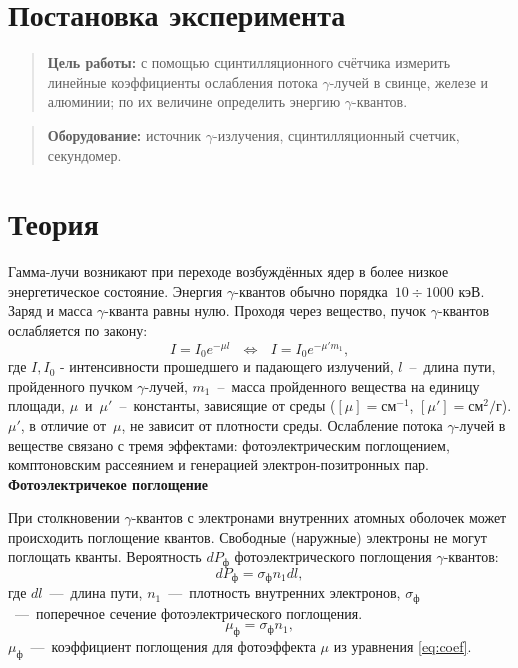 \documentclass{lab}
\begin{document}

\section*{Постановка эксперимента}

\begin{quote}
	\textbf{{\normalsize Цель работы: }}
	с помощью сцинтилляционного счётчика измерить линейные коэффициенты ослабления потока
	$\gamma$-лучей  в свинце, железе и алюминии; по их величине определить энергию 
	$\gamma$-квантов.
\end{quote}

\begin{quote}
	\textbf{{\normalsize Оборудование: }}
	источник $ \gamma $-излучения, сцинтилляционный счетчик, секундомер.
\end{quote}

\section*{Теория}

	Гамма-лучи возникают при переходе возбуждённых ядер в более низкое энергетическое 
	состояние. Энергия $\gamma$-квантов обычно порядка~$10\div1000$ кэВ. Заряд и масса 
	$\gamma$-кванта равны нулю. Проходя через вещество, пучок $\gamma$-квантов ослабляется 
	по закону:
	\begin{equation}\label{eq:coef}
		I = I_0e^{-\mu l} ~~~ \Leftrightarrow ~~~
		I=I_0e^{-\mu' m_1},
	\end{equation}
	где $I, I_0$ - интенсивности прошедшего и падающего излучений, $l$~--~длина пути, 
	пройденного  пучком $\gamma$-лучей, $m_1$~--~масса пройденного вещества на единицу 
	площади, $\mu$~и~$\mu'$~--~константы, зависящие от среды ($[\mu] = \text{см}^{-1}$, 
	$[\mu'] = \text{см}^{2}/\text{г}$). $\mu'$, в отличие от~$\mu$, не зависит от плотности 
	среды. Ослабление потока $\gamma$-лучей в веществе связано с тремя эффектами: 
	фотоэлектрическим поглощением, комптоновским рассеянием и генерацией 
	электрон-позитронных пар.\\
	
	\textbf{Фотоэлектричекое поглощение}
	
	При столкновении $\gamma$-квантов с электронами внутренних атомных оболочек может 
	происходить поглощение квантов. Свободные (наружные) электроны не могут поглощать 
	кванты. Вероятность $dP_\text{ф}$ фотоэлектрического поглощения $\gamma$-квантов: 
	\[ dP_\text{ф}=\sigma_\text{ф} n_1 dl, \]
	где $dl$~---~длина пути, $n_1$~---~плотность внутренних  электронов, 
	$\sigma_\text{ф}$~---~поперечное сечение фотоэлектрического поглощения.
	\[ \mu_\text{ф}=\sigma_\text{ф}n_1, \]	
	$\mu_\text{ф}$~---~коэффициент поглощения для фотоэффекта $\mu$ из уравнения \eqref{eq:coef}.
	
\end{document}
